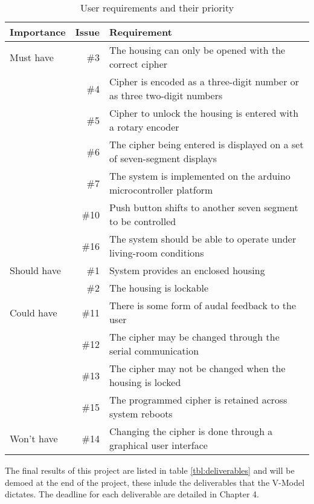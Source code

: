 \begin{table}
\centering
\caption{User requirements and their priority \label{tbl:userrequirements}}
\begin{adjustwidth}{-1in}{1in}
\begin{tabular}{lrl}
\\
Importance & Issue & Requirement \\ \hline
\hline Must have
& \#3 & The housing can only be opened with the correct cipher \\
& \#4 & Cipher is encoded as a three-digit number or as three two-digit numbers \\
& \#5 & Cipher to unlock the housing is entered with a rotary encoder \\
& \#6 & The cipher being entered is displayed on a set of seven-segment displays \\
& \#7 & The system is implemented on the arduino microcontroller platform \\
& \#10 & Push button shifts to another seven segment to be controlled \\
& \#16 & The system should be able to operate under living-room conditions \\
\hline Should have
& \#1 & System provides an enclosed housing \\
& \#2 & The housing is lockable \\
\hline Could have
& \#11 & There is some form of audal feedback to the user \\
& \#12 & The cipher may be changed through the serial communication \\
& \#13 & The cipher may not be changed when the housing is locked \\
& \#15 & The programmed cipher is retained across system reboots \\
\hline Won't have
& \#14 & Changing the cipher is done through a graphical user interface \\
\end{tabular}
\end{adjustwidth}
\end{table}

The final results of this project are listed in table \ref{tbl:deliverables} and will be demoed at the end of the project, these inlude the deliverables that the V-Model dictates. The deadline for each deliverable are detailed in Chapter 4.

